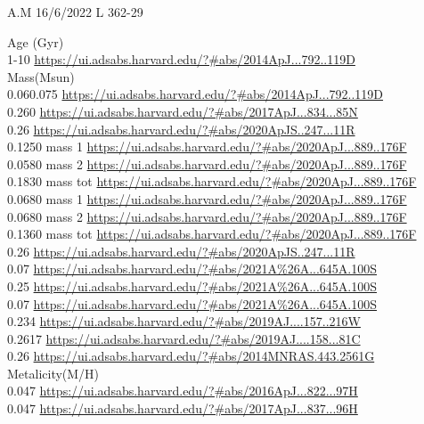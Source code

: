 A.M 16/6/2022
L 362-29 

Age (Gyr)\\
1-10 \url{https://ui.adsabs.harvard.edu/?#abs/2014ApJ...792..119D}\\

Mass(Msun)\\
0.060.075 \url{https://ui.adsabs.harvard.edu/?#abs/2014ApJ...792..119D}\\
0.260 \url{https://ui.adsabs.harvard.edu/?#abs/2017ApJ...834...85N}\\
0.26 \url{https://ui.adsabs.harvard.edu/?#abs/2020ApJS..247...11R}\\
0.1250 mass 1 \url{https://ui.adsabs.harvard.edu/?#abs/2020ApJ...889..176F}\\
0.0580 mass 2 \url{https://ui.adsabs.harvard.edu/?#abs/2020ApJ...889..176F}\\
0.1830 mass tot \url{https://ui.adsabs.harvard.edu/?#abs/2020ApJ...889..176F}\\
0.0680 mass 1 \url{https://ui.adsabs.harvard.edu/?#abs/2020ApJ...889..176F}\\
0.0680 mass 2 \url{https://ui.adsabs.harvard.edu/?#abs/2020ApJ...889..176F}\\
0.1360 mass tot \url{https://ui.adsabs.harvard.edu/?#abs/2020ApJ...889..176F}\\
0.26 \url{https://ui.adsabs.harvard.edu/?#abs/2020ApJS..247...11R}\\
0.07 \url{https://ui.adsabs.harvard.edu/?#abs/2021A%26A...645A.100S}\\
0.25 \url{https://ui.adsabs.harvard.edu/?#abs/2021A%26A...645A.100S}\\
0.07 \url{https://ui.adsabs.harvard.edu/?#abs/2021A%26A...645A.100S}\\
0.234	\url{https://ui.adsabs.harvard.edu/?#abs/2019AJ....157..216W}\\
0.2617 \url{https://ui.adsabs.harvard.edu/?#abs/2019AJ....158...81C}\\
0.26 \url{https://ui.adsabs.harvard.edu/?#abs/2014MNRAS.443.2561G}\\

Metalicity(M/H)\\
0.047 \url{https://ui.adsabs.harvard.edu/?#abs/2016ApJ...822...97H}\\
0.047 \url{https://ui.adsabs.harvard.edu/?#abs/2017ApJ...837...96H}\\

